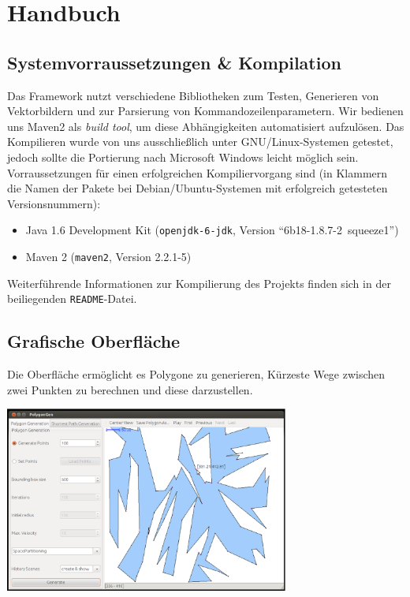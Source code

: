 \section{Handbuch}
  \label{sec:manual}

  \subsection{Systemvorraussetzungen \& Kompilation}

    Das Framework nutzt verschiedene Bibliotheken zum Testen, Generieren von
    Vektorbildern und zur Parsierung von
    Kommandozeilenparametern. Wir bedienen uns Maven2 als \emph{build tool}, um
    diese Abhängigkeiten automatisiert aufzulösen. Das Kompilieren wurde von
    uns ausschließlich unter GNU/Linux-Systemen getestet, jedoch sollte die
    Portierung nach Microsoft Windows leicht möglich sein. Vorraussetzungen
    für einen erfolgreichen Kompiliervorgang sind (in Klammern die Namen der Pakete
    bei Debian/Ubuntu-Systemen mit erfolgreich getesteten Versionsnummern):

    \begin{itemize}
      \item Java 1.6 Development Kit (\texttt{openjdk-6-jdk}, 
            Version \enquote{6b18-1.8.7-2~squeeze1})
      \item Maven 2 (\texttt{maven2}, Version 2.2.1-5)
    \end{itemize}

    Weiterführende Informationen zur Kompilierung des Projekts finden sich in
    der beiliegenden \texttt{README}-Datei.

  \subsection{Grafische Oberfläche}

    Die Oberfläche ermöglicht es Polygone zu generieren, Kürzeste Wege zwischen
    zwei Punkten zu berechnen und diese darzustellen.\\

    \begin{center}
      \includegraphics[width=0.7\textwidth]{img/GUI.eps}
    \end{center}


